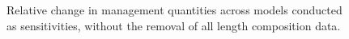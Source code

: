 \documentclass[
]{scrartcl}
\begin{document}
\begin{figure}


\caption{\label{fig-sens_sum_no_lengths}Relative change in management
quantities across models conducted as sensitivities, without the removal
of all length composition data.}

\end{figure}%
\end{document}
